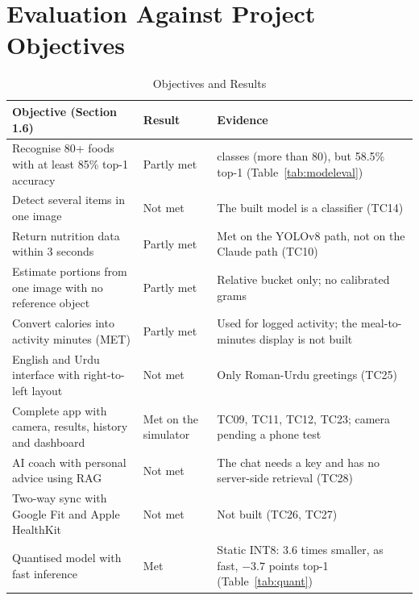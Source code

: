\section{Evaluation Against Project Objectives}
\begin{table}[H]
\centering
\caption{Objectives and Results}
\label{tab:objectives}
\small
\begin{tabularx}{\textwidth}{|>{\raggedright\arraybackslash}p{5.2cm}|>{\raggedright\arraybackslash}p{2.6cm}|>{\raggedright\arraybackslash}X|}
\hline
\textbf{Objective (Section 1.6)} & \textbf{Result} & \textbf{Evidence} \\ \hline
Recognise 80+ foods with at least 85\% top-1 accuracy & Partly met & 217 classes (more than 80), but 58.5\% top-1 (Table~\ref{tab:modeleval}) \\ \hline
Detect several items in one image & Not met & The built model is a classifier (TC14) \\ \hline
Return nutrition data within 3 seconds & Partly met & Met on the YOLOv8 path, not on the Claude path (TC10) \\ \hline
Estimate portions from one image with no reference object & Partly met & Relative bucket only; no calibrated grams \\ \hline
Convert calories into activity minutes (MET) & Partly met & Used for logged activity; the meal-to-minutes display is not built \\ \hline
English and Urdu interface with right-to-left layout & Not met & Only Roman-Urdu greetings (TC25) \\ \hline
Complete app with camera, results, history and dashboard & Met on the simulator & TC09, TC11, TC12, TC23; camera pending a phone test \\ \hline
AI coach with personal advice using RAG & Not met & The chat needs a key and has no server-side retrieval (TC28) \\ \hline
Two-way sync with Google Fit and Apple HealthKit & Not met & Not built (TC26, TC27) \\ \hline
Quantised model with fast inference & Met & Static INT8: 3.6 times smaller, as fast, $-3.7$ points top-1 (Table~\ref{tab:quant}) \\ \hline
\end{tabularx}
\end{table}

